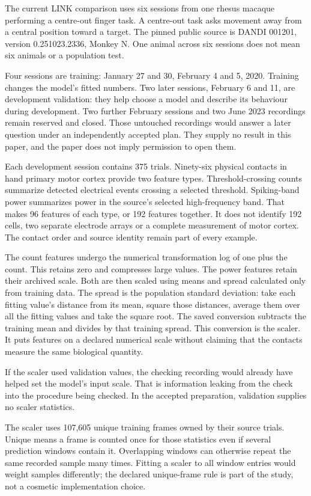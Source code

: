 The current LINK comparison uses six sessions from one rhesus macaque performing
a centre-out finger task. A centre-out task asks movement away from a central
position toward a target. The pinned public source is DANDI 001201, version
0.251023.2336, Monkey N.\cite{linkarchive} One animal across six sessions does
not mean six animals or a population test.

Four sessions are training: January 27 and 30, February 4 and 5, 2020. Training
changes the model's fitted numbers. Two later sessions, February 6 and 11,
are development validation: they help choose a model and describe its behaviour
during development. Two further February sessions and two June 2023 recordings
remain reserved and closed. Those untouched recordings would answer a later
question under an independently accepted plan. They supply no result in this
paper, and the paper does not imply permission to open them.

Each development session contains 375 trials. Ninety-six physical contacts in
hand primary motor cortex provide two feature types. Threshold-crossing counts
summarize detected electrical events crossing a selected threshold. Spiking-band
power summarizes power in the source's selected high-frequency band. That makes
96 features of each type, or 192 features together. It does not identify 192
cells, two separate electrode arrays or a complete measurement of motor cortex.
The contact order and source identity remain part of every example.

The count features undergo the numerical transformation log of one plus the
count. This retains zero and compresses large values. The power features retain
their archived scale. Both are then scaled using means and spread calculated
only from training data. The spread is the population standard deviation: take
each fitting value's distance from its mean, square those distances, average
them over all the fitting values and take the square root. The saved conversion
subtracts the training mean and divides by that training spread. This conversion
is the scaler. It puts features on a declared numerical scale without claiming
that the contacts measure the same biological quantity.

If the scaler used validation values, the checking recording would already
have helped set the model's input scale. That is information leaking from the
check into the procedure being checked. In the accepted preparation, validation
supplies no scaler statistics.

The scaler uses 107,605 unique training frames owned by their source trials.
Unique means a frame is counted once for those statistics even if several
prediction windows contain it. Overlapping windows can otherwise repeat the
same recorded sample many times. Fitting a scaler to all window entries would
weight samples differently; the declared unique-frame rule is part of the
study, not a cosmetic implementation choice.

